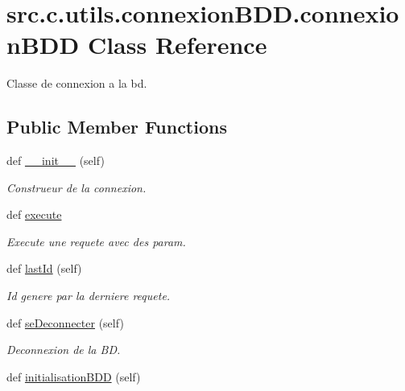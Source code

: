 \hypertarget{classsrc_1_1c_1_1utils_1_1connexion_b_d_d_1_1connexion_b_d_d}{}\section{src.\+c.\+utils.\+connexion\+B\+D\+D.\+connexion\+B\+D\+D Class Reference}
\label{classsrc_1_1c_1_1utils_1_1connexion_b_d_d_1_1connexion_b_d_d}


Classe de connexion a la bd.  


\subsection*{Public Member Functions}
\begin{DoxyCompactItemize}
\item 
def \hyperlink{classsrc_1_1c_1_1utils_1_1connexion_b_d_d_1_1connexion_b_d_d_a813acaf20e4c4c132c8dca5d91db06d8}{\+\_\+\+\_\+init\+\_\+\+\_\+} (self)
\begin{DoxyCompactList}\small\item\em Construeur de la connexion. \end{DoxyCompactList}\item 
def \hyperlink{classsrc_1_1c_1_1utils_1_1connexion_b_d_d_1_1connexion_b_d_d_a11fab35e2e1185301a371bdb1b918eb9}{execute}
\begin{DoxyCompactList}\small\item\em Execute une requete avec des param. \end{DoxyCompactList}\item 
def \hyperlink{classsrc_1_1c_1_1utils_1_1connexion_b_d_d_1_1connexion_b_d_d_a437a7c2cc8de619317139c7807be1643}{last\+Id} (self)
\begin{DoxyCompactList}\small\item\em Id genere par la derniere requete. \end{DoxyCompactList}\item 
\hypertarget{classsrc_1_1c_1_1utils_1_1connexion_b_d_d_1_1connexion_b_d_d_ad6a56c876724846f9f09102e87a6be59}{}def \hyperlink{classsrc_1_1c_1_1utils_1_1connexion_b_d_d_1_1connexion_b_d_d_ad6a56c876724846f9f09102e87a6be59}{se\+Deconnecter} (self)\label{classsrc_1_1c_1_1utils_1_1connexion_b_d_d_1_1connexion_b_d_d_ad6a56c876724846f9f09102e87a6be59}

\begin{DoxyCompactList}\small\item\em Deconnexion de la B\+D. \end{DoxyCompactList}\item 
\hypertarget{classsrc_1_1c_1_1utils_1_1connexion_b_d_d_1_1connexion_b_d_d_a398aa8e70dc86d4f122d47dd54eb909c}{}def \hyperlink{classsrc_1_1c_1_1utils_1_1connexion_b_d_d_1_1connexion_b_d_d_a398aa8e70dc86d4f122d47dd54eb909c}{initialisation\+B\+D\+D} (self)\label{classsrc_1_1c_1_1utils_1_1connexion_b_d_d_1_1connexion_b_d_d_a398aa8e70dc86d4f122d47dd54eb909c}


\end{DoxyCompactItemize}
